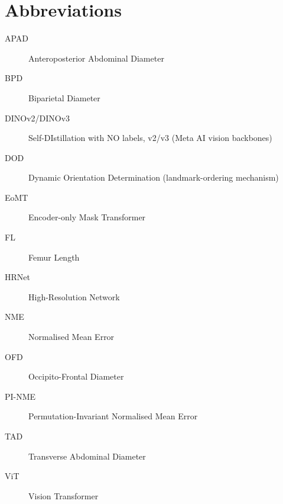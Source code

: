 \chapter*{Abbreviations}

\begin{description}
  \item[APAD] Anteroposterior Abdominal Diameter
  \item[BPD] Biparietal Diameter
  \item[DINOv2/DINOv3] Self-\textsc{DI}stillation with \textsc{NO} labels, v2/v3 (Meta AI vision backbones)
  \item[DOD] Dynamic Orientation Determination (landmark-ordering mechanism)
  \item[EoMT] Encoder-only Mask Transformer
  \item[FL] Femur Length
  \item[HRNet] High-Resolution Network
  \item[NME] Normalised Mean Error
  \item[OFD] Occipito-Frontal Diameter
  \item[PI-NME] Permutation-Invariant Normalised Mean Error
  \item[TAD] Transverse Abdominal Diameter
  \item[ViT] Vision Transformer
\end{description}
